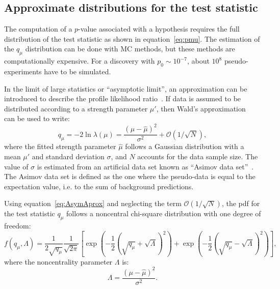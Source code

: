     \subsection{Approximate distributions for the test statistic}
    \label{subsec:asimov}
    
    The computation of a $p$-value associated with a hypothesis requires the full distribution of the test statistic as shown in equation~\ref{eq:pmu}. 
    The estimation of the $q_\mu$ distribution can be done with MC methods, but these
    methods are computationally expensive. For a discovery 
    with $p_0\sim 10^{-7}$, about $10^8$ pseudo-experiments have to be simulated. 

    In the limit of large statistics or ``asymptotic limit'', an approximation can be introduced to describe the profile likelihood ratio~\cite{Cowan:2010js}.
    If data is assumed to be distributed according to a strength parameter $\mu'$, then Wald's approximation~\cite{WaldApprox}
    can be used to write:
    \begin{equation}
      \label{eq:AsymAprox}
      q_\mu = -2\ln \lambda(\mu) = \frac{(\mu-\hat{\mu})^2}{\sigma^2} + \mathcal{O}(1/\sqrt{N}),
    \end{equation}
    where the fitted strength parameter $\hat{\mu}$ follows a Gaussian distribution with a mean $\mu'$ and standard deviation $\sigma$, and $N$
    accounts for the data sample size. 
    The value of $\sigma$ is estimated from an artificial 
    data set known as ``Asimov data set''~\cite{Cowan:2010js}.
    The Asimov data set is defined as the one where the pseudo-data is equal to the expectation value, i.e. to the sum of background predictions.

    Using equation~\ref{eq:AsymAprox} and neglecting the term $\mathcal{O}(1/\sqrt{N})$, the pdf for the test statistic $q_\mu$ follows 
    a noncentral chi-square distribution with one degree of freedom:
    \begin{equation}
      f(q_\mu, \Lambda) = \frac{1}{2\sqrt{q_\mu}}\frac{1}{\sqrt{2\pi}}\left[
        \exp\left(-\frac{1}{2}(\sqrt{q_\mu}+\sqrt{\Lambda})^2\right) +
        \exp\left(-\frac{1}{2}(\sqrt{q_\mu}-\sqrt{\Lambda})^2\right) \right] ,
      \label{eq:qmu_pdf}
    \end{equation}
    where the noncentrality parameter $\Lambda$ is: 
    \begin{equation}
    \Lambda=\frac{(\mu-\hat{\mu})^2}{\sigma^2}.
      \label{eq:Lambda}
    \end{equation}
    

